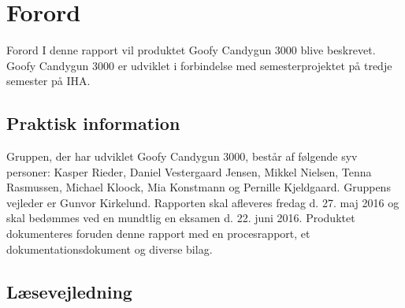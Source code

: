 \chapter{Forord}
Forord
I denne rapport vil produktet Goofy Candygun 3000 blive beskrevet. Goofy Candygun 3000 er udviklet i forbindelse med semesterprojektet på tredje semester på IHA.

\section{Praktisk information}
Gruppen, der har udviklet Goofy Candygun 3000, består af følgende syv personer: Kasper Rieder, Daniel Vestergaard Jensen, Mikkel Nielsen, Tenna Rasmussen, Michael Kloock, Mia Konstmann og Pernille Kjeldgaard. Gruppens vejleder er Gunvor Kirkelund. Rapporten skal afleveres fredag d. 27. maj 2016 og skal bedømmes ved en mundtlig en eksamen d. 22. juni 2016. Produktet dokumenteres foruden denne rapport med en procesrapport, et dokumentationsdokument og diverse bilag. 

\section{Læsevejledning}
